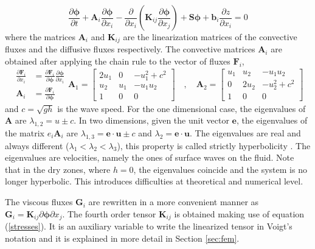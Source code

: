 \documentclass[a4paper,12pt]{elsarticle}
\newcommand{\pder}[2]{\frac{\partial#1}{\partial#2}}
\begin{document}
\begin{equation}
\pder{\bm{\phi}}{t} + \mathbf{A}_i\pder{\bm{\phi}}{x_i}
 - \pder{}{x_{i}}\left(\mathbf{K}_{ij}\pder{\bm{\phi}}{x_j}\right) + \mathbf{S}\bm{\phi} + \mathbf{b}_i\pder{z}{x_i} = 0
\end{equation}
where the matrices $\mathbf{A}_i$ and $\mathbf{K}_{ij}$ are the linearization matrices of the convective fluxes and the diffusive fluxes respectively. The convective matrices $\mathbf{A}_i$ are obtained after applying the chain rule to the vector of fluxes $\mathbf{F}_i$,
\begin{subequations}
\begin{align}
\pder{\mathbf{F}_i}{x_i} &= \pder{\mathbf{F}_i}{\bm{\phi}}\pder{\bm{\phi}}{x_i} \\
\mathbf{A}_i &= \pder{\mathbf{F}_i}{\bm{\phi}}
\end{align}
\begin{equation}
\mathbf{A}_1 = \left[\begin{matrix}
        2u_1 & 0   & -u_1^2 + c^2 \\
        u_2  & u_1 & -u_1 u_2 \\
        1    & 0   & 0
    \end{matrix} \right]
\quad , \quad
\mathbf{A}_2 = \left[\begin{matrix}
        u_1 & u_2  & -u_1 u_2 \\
        0   & 2u_2 & -u_2^2 + c^2 \\
        1   & 0    & 0
    \end{matrix} \right]
\end{equation}
\end{subequations}
and $c=\sqrt{gh}$ is the wave speed.
For the one dimensional case, the eigenvalues of $\mathbf{A}$ are $\lambda_{1,2}=u\pm c$.
In two dimensions, given the unit vector $\mathbf{e}$, the eigenvalues of the matrix $e_i \mathbf{A}_i$ are $\lambda_{1,3} = \mathbf{e}\cdot\mathbf{u} \pm c$ and $\lambda_2 = \mathbf{e}\cdot\mathbf{u}$.
The eigenvalues are real and always different ($\lambda_1<\lambda_2<\lambda_3$), this property is called strictly hyperbolicity \cite{raviart1996}. The eigenvalues are velocities, namely the ones of surface waves on the fluid. Note that in the dry zones, where ${h=0}$, the eigenvalues coincide and the system is no longer hyperbolic. This introduces difficulties at theoretical and numerical level.


The viscous fluxes $\mathbf{G}_i$ are rewritten in a more convenient manner as ${\mathbf{G}_i = \mathbf{K}_{ij} \partial\bm{\phi}\partial x_j}$. The fourth order tensor $\mathbf{K}_{ij}$ is obtained making use of equation (\ref{stresses}). It is an auxiliary variable to write the linearized tensor in Voigt's notation and it is explained in more detail in Section \ref{sec:fem}.
\end{document}
